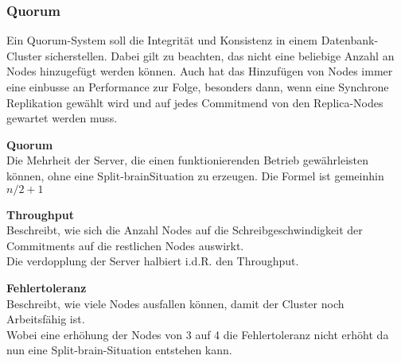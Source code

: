 
\subsubsection{Quorum}
\label{chap:Quorum}
\begin{flushleft}
    Ein Quorum-System soll die Integrität und Konsistenz in einem Datenbank-Cluster sicherstellen.
    Dabei gilt zu beachten, das nicht eine beliebige Anzahl an Nodes hinzugefügt werden können.
    Auch hat das Hinzufügen von Nodes immer eine einbusse an Performance zur Folge, besonders dann, wenn eine Synchrone Replikation gewählt wird und auf jedes Commitmend von den Replica-Nodes gewartet werden muss.

    \begin{description}
        \item \textbf{Quorum}\hfill \\Die Mehrheit der Server, die einen funktionierenden Betrieb gewährleisten können, ohne eine \Gls{Split-brain}Situation zu erzeugen.
        Die Formel ist gemeinhin \(n/2 + 1\)
        \item \textbf{Throughput}\hfill \\Beschreibt, wie sich die Anzahl Nodes auf die Schreibgeschwindigkeit der Commitments auf die restlichen Nodes auswirkt.\\Die verdopplung der Server halbiert i.d.R. den Throughput.
        \item \textbf{Fehlertoleranz}\hfill \\Beschreibt, wie viele Nodes ausfallen können, damit der Cluster noch Arbeitsfähig ist.\\Wobei eine erhöhung der Nodes von 3 auf 4 die Fehlertoleranz nicht erhöht da nun eine \Gls{Split-brain}-Situation entstehen kann.
    \end{description}

\end{flushleft}
